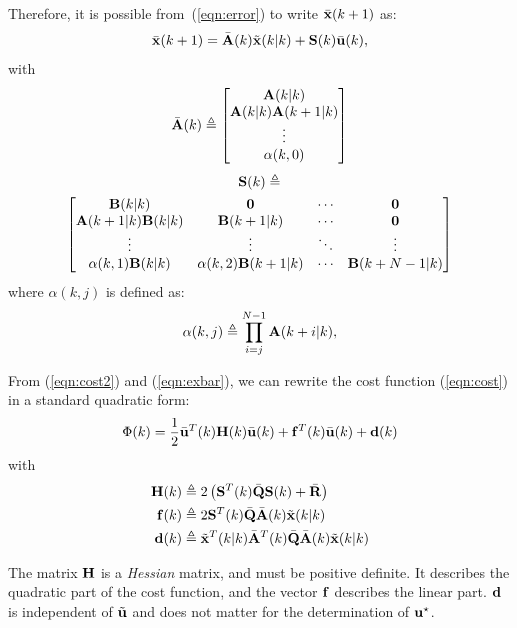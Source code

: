 \documentclass[conference]{IEEEtran} %
\begin{document}
Therefore, it is possible from~(\ref{eqn:error}) to write $\bar{\bf x}(k+1)$ as:
\begin{equation}\label{eqn:exbar}
	\bar{\bf x}(k+1) = \bar{\bf A}(k)\tilde{\bf x}(k|k)+{\bf S}(k)\bar{\bf u}(k),
\end{equation}
with
\begin{equation*}
	\bar{\bf A}(k) \triangleq \begin{bmatrix}
		{\bf A}(k|k) \\ {\bf A}(k|k){\bf A}(k+1|k) \\ \vdots \\ \alpha(k,0)
	\end{bmatrix}
\end{equation*}
{\small
\begin{multline*}
		{\bf S}(k) \triangleq \\ \begin{bmatrix}
			{\bf B}(k|k)		       & {\bf 0} 			    	 & \cdots & {\bf 0}         \\
			{\bf A}(k+1|k){\bf B}(k|k) & {\bf B}(k+1|k)      	 & \cdots & {\bf 0}         \\
			\vdots			       & \vdots				 & \ddots & \vdots          \\
			\alpha(k,1){\bf B}(k|k)    & \alpha(k,2){\bf B}(k+1|k) & \cdots & {\bf B}(k+N-1|k)
		\end{bmatrix}
\end{multline*}
}
where  $\alpha(k,j)$ is defined as:
\begin{equation*}
	\alpha(k,j) \triangleq \prod_{i=j}^{N-1}{\bf A}(k+i|k),
\end{equation*}

From (\ref{eqn:cost2}) and (\ref{eqn:exbar}), we can rewrite the cost function (\ref{eqn:cost}) in a standard quadratic form:
\begin{equation}
	\Phi(k) = \frac{1}{2}\bar{\bf u}^T(k){\bf H}(k)\bar{\bf u}(k) + {\bf f}^T(k)\bar{\bf u}(k) + {\bf d}(k)
\end{equation}
with
\begin{align*}
	{\bf H}(k) &\triangleq 2\left({\bf S}^T(k)\bar{\bf Q}{\bf S}(k)+\bar{\bf R}\right) \\
	{\bf f}(k) &\triangleq 2{\bf S}^T(k)\bar{\bf Q}\bar{\bf A}(k)\tilde{\bf x}(k|k) \\
	{\bf d}(k) &\triangleq \tilde{\bf x}^T(k|k)\bar{\bf A}^T(k)\bar{\bf Q}\bar{\bf A}(k)\tilde{\bf x}(k|k)
\end{align*}

The matrix ${\bf H}$ is a {\em Hessian} matrix, and must be positive
definite. It describes the quadratic part of the cost function, and the
vector ${\bf f}$ describes the linear part. $\bf d$ is independent of
$\tilde{\bf u}$ and does not matter for the determination of $\bf u^\star$.
\end{document}
